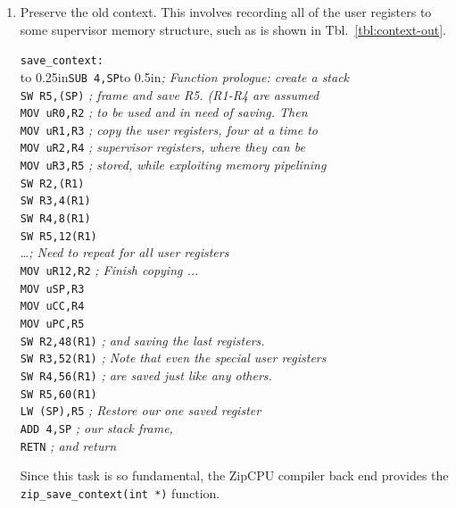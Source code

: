 \documentclass{gqtekspec}
\begin{document}
\begin{enumerate}
\item Preserve the old context.  This involves recording all of the user
	registers to some supervisor memory structure, such as is shown in
	Tbl.~\ref{tbl:context-out}.
\begin{table}\begin{center}
\begin{tabbing}
{\tt save\_context:} \\
\hbox to 0.25in{}\={\tt SUB 4,SP}\hbox to 0.5in{}\= {\em ; Function prologue: create a stack}\\
\>        {\tt SW R5,(SP)}	\> {\em ; frame and save R5.  (R1-R4 are assumed}\\
\>        {\tt MOV uR0,R2}	\> {\em ; to be used and in need of saving.  Then}\\
\>        {\tt MOV uR1,R3}	\> {\em ; copy the user registers, four at a time to }\\
\>        {\tt MOV uR2,R4}	\> {\em ; supervisor registers, where they can be}\\
\>        {\tt MOV uR3,R5}	\> {\em ; stored, while exploiting memory pipelining}\\
\>        {\tt SW R2,(R1)}	\\
\>        {\tt SW R3,4(R1)}	\\
\>        {\tt SW R4,8(R1)}	\\
\>        {\tt SW R5,12(R1)} \\
\>	\ldots {\em ; Need to repeat for all user registers} \\
\>        {\tt MOV uR12,R2}	\> {\em ; Finish copying ... } \\
\>        {\tt MOV uSP,R3} \\
\>        {\tt MOV uCC,R4} \\
\>        {\tt MOV uPC,R5} \\
\>        {\tt SW R2,48(R1)}	\> {\em ; and saving the last registers.}\\
\>        {\tt SW R3,52(R1)}	\> {\em ; Note that even the special user registers }\\
\>        {\tt SW R4,56(R1)}	\> {\em ; are saved just like any others. }\\
\>        {\tt SW R5,60(R1)} \\
\>        {\tt LW (SP),R5}	\> {\em ; Restore our one saved register}\\
\>        {\tt ADD 4,SP}		\> {\em ; our stack frame,} \\
\>        {\tt RETN}		\> {\em ; and return }\\
\end{tabbing}
\caption{Example Storing User Task Context}\label{tbl:context-out}
\end{center}\end{table}
Since this task is so fundamental, the ZipCPU compiler back end provides
the {\tt zip\_save\_context(int *)} function.  


\end{enumerate}
\end{document}
